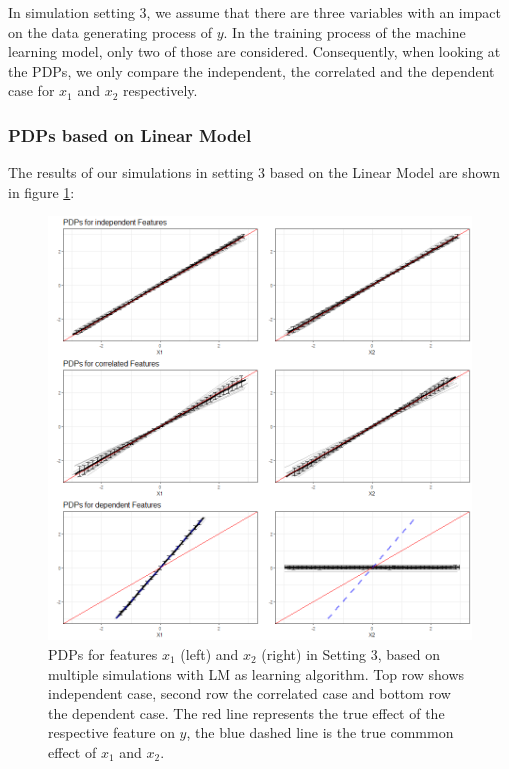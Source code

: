 \documentclass[
]{krantz}
\begin{document}
In simulation setting 3, we assume that there are three variables with an impact on the data generating process of \(y\). In the training process of the machine learning model, only two of those are considered. Consequently, when looking at the PDPs, we only compare the independent, the correlated and the dependent case for \(x_1\) and \(x_2\) respectively.

\hypertarget{pdps-based-on-linear-model-1}{%
\subsubsection{PDPs based on Linear Model}\label{pdps-based-on-linear-model-1}}

The results of our simulations in setting 3 based on the Linear Model are shown in figure \ref{fig:Figure19}:

\begin{figure}

\includegraphics[width=1\linewidth]{images/VK_PDP_19_Set3_LM} \hfill{}

\caption{PDPs for features $x_1$ (left) and $x_2$  (right) in Setting 3, based on multiple simulations with LM as learning algorithm. Top row shows independent case, second row the correlated case and bottom row the dependent case. The red line represents the true effect of the respective feature on $y$, the blue dashed line is the true commmon effect of $x_1$ and $x_2$.}\label{fig:Figure19}
\end{figure}
\end{document}
